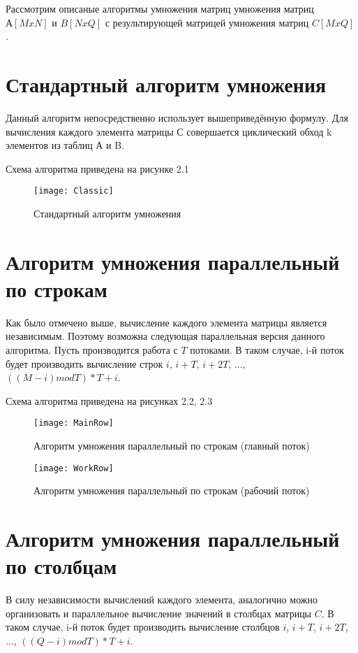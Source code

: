 Рассмотрим описаные алгоритмы умножения матриц умножения матриц $ А[MxN] $ и $ B[NxQ] $ с результирующей матрицей умножения матриц $ C[MxQ] $.

\section{Стандартный алгоритм умножения}
Данный алгоритм непосредственно использует вышеприведённую формулу. Для вычисления каждого элемента матрицы С совершается циклический обход k элементов из таблиц А и B.

Схема алгоритма приведена на рисунке 2.1
\begin{figure}[h]
	\begin{center}
		{\texttt{[image: Classic]}}
		\caption{Стандартный алгоритм умножения}
	\end{center}
\end{figure}


\section{Алгоритм умножения параллельный по строкам}
Как было отмечено выше, вычисление каждого элемента матрицы является независимым. Поэтому возможна следующая параллельная версия данного алгоритма. Пусть производится работа с $T$ потоками. В таком случае, i-й поток будет производить вычисление строк $i$, $i+T$, $i+2T$, ..., $((M-i) mod T)*T + i$.

Схема алгоритма приведена на рисунках 2.2, 2.3
\begin{figure}[h]
	\begin{center}
		{\texttt{[image: MainRow]}}
		\caption{Алгоритм умножения параллельный по строкам (главный поток)}
	\end{center}
\end{figure}
\begin{figure}[h]
	\begin{center}
		{\texttt{[image: WorkRow]}}
		\caption{Алгоритм умножения параллельный по строкам (рабочий поток)}
	\end{center}
\end{figure}


\section{Алгоритм умножения параллельный по столбцам}
В силу независимости вычислений каждого элемента, аналогично можно организовать и параллельное вычисление значений в столбцах матрицы $C$. В таком случае, i-й поток будет производить вычисление столбцов $i$, $i+T$, $i+2T$, ..., $((Q-i) mod T)*T + i$.

